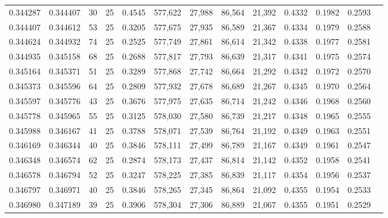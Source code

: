 \begin{tabular}{rrrrrrrrrrrrr}
0.344287 & 0.344407 &    30 &  25 &                                     0.4545 & 577,622 &  27,988 &  86,564 &  21,392 & 0.4332 & 0.1982 & 0.2593 \\
0.344407 & 0.344612 &    53 &  25 &                                     0.3205 & 577,675 &  27,935 &  86,589 &  21,367 & 0.4334 & 0.1979 & 0.2588 \\
0.344624 & 0.344932 &    74 &  25 &                                     0.2525 & 577,749 &  27,861 &  86,614 &  21,342 & 0.4338 & 0.1977 & 0.2581 \\
0.344935 & 0.345158 &    68 &  25 &                                     0.2688 & 577,817 &  27,793 &  86,639 &  21,317 & 0.4341 & 0.1975 & 0.2574 \\
0.345164 & 0.345371 &    51 &  25 &                                     0.3289 & 577,868 &  27,742 &  86,664 &  21,292 & 0.4342 & 0.1972 & 0.2570 \\
0.345373 & 0.345596 &    64 &  25 &                                     0.2809 & 577,932 &  27,678 &  86,689 &  21,267 & 0.4345 & 0.1970 & 0.2564 \\
0.345597 & 0.345776 &    43 &  25 &                                     0.3676 & 577,975 &  27,635 &  86,714 &  21,242 & 0.4346 & 0.1968 & 0.2560 \\
0.345778 & 0.345965 &    55 &  25 &                                     0.3125 & 578,030 &  27,580 &  86,739 &  21,217 & 0.4348 & 0.1965 & 0.2555 \\
0.345988 & 0.346167 &    41 &  25 &                                     0.3788 & 578,071 &  27,539 &  86,764 &  21,192 & 0.4349 & 0.1963 & 0.2551 \\
0.346169 & 0.346344 &    40 &  25 &                                     0.3846 & 578,111 &  27,499 &  86,789 &  21,167 & 0.4349 & 0.1961 & 0.2547 \\
0.346348 & 0.346574 &    62 &  25 &                                     0.2874 & 578,173 &  27,437 &  86,814 &  21,142 & 0.4352 & 0.1958 & 0.2541 \\
0.346578 & 0.346794 &    52 &  25 &                                     0.3247 & 578,225 &  27,385 &  86,839 &  21,117 & 0.4354 & 0.1956 & 0.2537 \\
0.346797 & 0.346971 &    40 &  25 &                                     0.3846 & 578,265 &  27,345 &  86,864 &  21,092 & 0.4355 & 0.1954 & 0.2533 \\
0.346980 & 0.347189 &    39 &  25 &                                     0.3906 & 578,304 &  27,306 &  86,889 &  21,067 & 0.4355 & 0.1951 & 0.2529 \\

\end{tabular}
